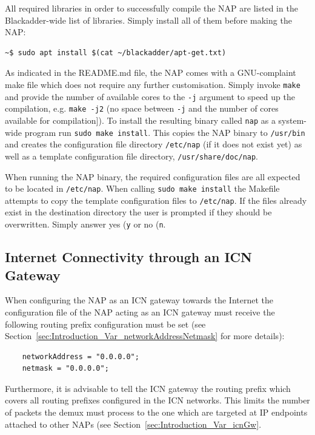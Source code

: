 \documentclass[a4paper,11pt,titlepage]{report}
\begin{document}
All required libraries in order to successfully compile the \ac{NAP} are listed in the Blackadder-wide list of libraries. Simply install all of them before making the NAP:

\begin{lstlisting}
~$ sudo apt install $(cat ~/blackadder/apt-get.txt)
\end{lstlisting}

As indicated in the README.md file, the NAP comes with a GNU-complaint make file which does not require any further customisation. Simply invoke \texttt{make} and provide the number of available cores to the \texttt{-j} argument to speed up the compilation, e.g. \texttt{make -j2} (no space between \texttt{-j} and the number of cores available for compilation]). To install the resulting binary called \texttt{nap} as a system-wide program run \texttt{sudo make install}. This copies the \ac{NAP} binary to \texttt{/usr/bin} and creates the configuration file directory \texttt{/etc/nap} (if it does not exist yet) as well as a template configuration file directory, \texttt{/usr/share/doc/nap}. 

When running the \ac{NAP} binary, the required configuration files are all expected to be located in \texttt{/etc/nap}. When calling \texttt{sudo make install} the Makefile attempts to copy the template configuration files to \texttt{/etc/nap}. If the files already exist in the destination directory the user is prompted if they should be overwritten. Simply answer yes (\texttt{y} or no (\texttt{n}.

\subsection{Internet Connectivity through an ICN Gateway}\label{sec:Introduciton_ICNGW}
When configuring the \ac{NAP} as an ICN gateway towards the Internet the configuration file of the \ac{NAP} acting as an ICN gateway must receive the following routing prefix configuration must be set (see Section~\ref{sec:Introduction_Var_networkAddressNetmask} for more details):

\begin{lstlisting}
	networkAddress = "0.0.0.0";
	netmask = "0.0.0.0";
\end{lstlisting}

Furthermore, it is advisable to tell the ICN gateway the routing prefix which covers all routing prefixes configured in the ICN networks. This limits the number of packets the demux must process to the one which are targeted at IP endpoints attached to other \acp{NAP} (see Section~\ref{sec:Introduction_Var_icnGw}.
\end{document}
